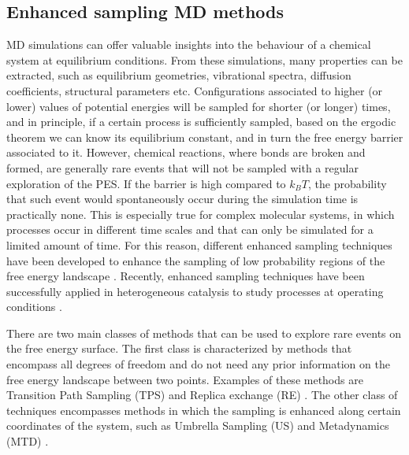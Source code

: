 \subsection{Enhanced sampling MD methods}
MD simulations can offer valuable insights into the behaviour of a chemical system at equilibrium conditions. From these simulations, many properties can be extracted, such as equilibrium geometries, vibrational spectra, diffusion coefficients, structural parameters etc. Configurations associated to higher (or lower) values of potential energies will be sampled for shorter (or longer) times, and in principle, if a certain process is sufficiently sampled, based on the ergodic theorem we can know its equilibrium constant, and in turn the free energy barrier associated to it. However, chemical reactions, where bonds are broken and formed, are generally rare events that will not be sampled with a regular exploration of the PES. If the barrier is high compared to $k_{B}T$, the probability that such event would spontaneously occur during the simulation time is practically none. This is especially true for complex molecular systems, in which processes occur in different time scales and that can only be simulated for a limited amount of time. For this reason, different enhanced sampling techniques have been developed to enhance the sampling of low probability regions of the free energy landscape \cite{valsson2016enhancing, laio2002escaping, sutto2012new, carter1989constrained, darve2001calculating, jarzynski1997nonequilibrium, rosso2002use, gullingsrud1999reconstructing}. Recently, enhanced sampling techniques have been successfully applied in heterogeneous catalysis to study processes at operating conditions \cite{dewispelaere2016insight, dewispelaere2015complex, vanspeybroeck2014first, cnudde2017effect, haigis2015hydrothermal, buvcko2011monomolecular, fraux2017recent}.

There are two main classes of methods that can be used to explore rare events on the free energy surface. The first class is characterized by methods that encompass all degrees of freedom and do not need any prior information on the free energy landscape between two points. Examples of these methods are Transition Path Sampling (TPS) \cite{dellago2002transition} and Replica exchange (RE) \cite{sugita1999replica}. The other class of techniques encompasses methods in which the sampling is enhanced along certain coordinates of the system, such as Umbrella Sampling (US) \cite{torrie1977nonphysical, patey1975monte} and Metadynamics (MTD) \cite{laio2002escaping}.


